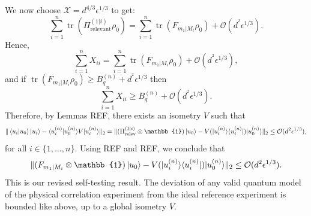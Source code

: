 We now choose $\mathcal{X}=d^{4/3}\epsilon^{1/3}$ to get:
\begin{equation}
\sum_{i=1}^n\operatorname{tr}(\Pi_{\text{relevant}}^{(1\vert i)}\rho_0) = \sum_{i=1}^n\operatorname{tr}(F_{m_1\vert M_i}\rho_0)+\mathcal{O}(d^{^2}\epsilon^{1/3}).
\end{equation}
Hence,
\begin{equation}
\sum_{i=1}^n X_{ii} = \sum_{i=1}^n\operatorname{tr}(F_{m_1\vert M_i}\rho_0)+\mathcal{O}(d^{^2}\epsilon^{1/3}),
\end{equation}
and if $\operatorname{tr}(F_{m_1\vert M_i}\rho_0)\geq B_q^{(n)}+d^{^2}\epsilon^{1/3}$ then
\begin{equation}
\sum_{i=1}^n X_{ii} \geq B_q^{(n)}+\mathcal{O}(d^{^2}\epsilon^{1/3}).
\end{equation}
Therefore, by Lemmas REF, there exists an isometry $V$ such that
\begin{equation}
\|\bra{u_i}\ket{u_0}\ket{u_i}-\langle u_i^{(n)}\vert u_0^{(n)}\rangle V \vert u_i^{(n)} \rangle \|_2 = \|(\Pi_{\text{relev}}^{(1\vert i)}\otimes \mathbb{1})\ket{u_0}-V(\vert u_i^{(n)}\rangle \langle u_i^{(n)} \vert)\vert u_0^{(n)} \rangle \|_2 \leq \mathcal{O}(d^2\epsilon^{1/3}),
\end{equation}
for all $i \in \{1,\dots,n\}$.
Using REF and REF, we conclude that
\begin{equation}
\|(F_{m_1\vert M_i}\otimes \mathbb{1})\ket{u_0}-V(\vert u_i^{(n)}\rangle \langle u_i^{(n)} \vert) \vert u_0^{(n)} \rangle \|_2 \leq \mathcal{O}(d^2\epsilon^{1/3}).
\end{equation}
This is our revised self-testing result. The deviation of any valid quantum model of the physical correlation experiment from the ideal reference experiment is bounded like above, up to a global isometry $V$.
